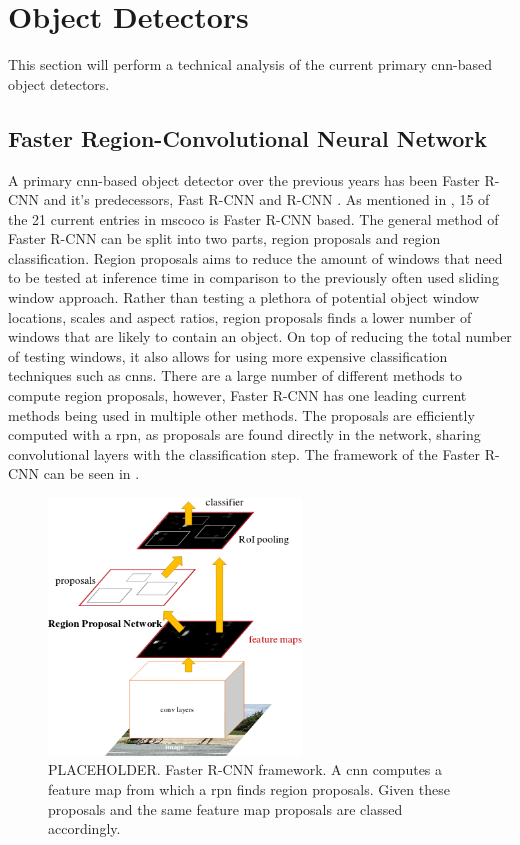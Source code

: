 \section{Object Detectors}
This section will perform a technical analysis of the current primary \gls{cnn}-based object detectors.

\subsection{Faster Region-Convolutional Neural Network}
A primary \gls{cnn}-based object detector over the previous years has been Faster R-CNN \cite{fasterrcnn} and it's predecessors, Fast R-CNN \cite{fastrcnn} and R-CNN \cite{rcnn}. As mentioned in , 15 of the 21 current entries in \gls{mscoco} is Faster R-CNN based. The general method of Faster R-CNN can be split into two parts, region proposals and region classification. Region proposals aims to reduce the amount of windows that need to be tested at inference time in comparison to the previously often used sliding window approach. Rather than testing a plethora of potential object window locations, scales and aspect ratios, region proposals finds a lower number of windows that are likely to contain an object. On top of reducing the total number of testing windows, it also allows for using more expensive classification techniques such as \glspl{cnn}. There are a large number of different methods to compute region proposals, however, Faster R-CNN has one leading current methods being used in multiple other methods. The proposals are efficiently computed with a \gls{rpn}, as proposals are found directly in the network, sharing convolutional layers with the classification step. The framework of the Faster R-CNN can be seen in . 

\begin{figure}[H]
  \centering
    \includegraphics[width=0.6\textwidth]{Figs/Techanal/fasterframework.png}
      \caption{PLACEHOLDER. Faster R-CNN framework. A \gls{cnn} computes a feature map from which a \gls{rpn} finds region proposals. Given these proposals and the same feature map proposals are classed accordingly.}
    \label{fig:fasterframework}
\end{figure}

